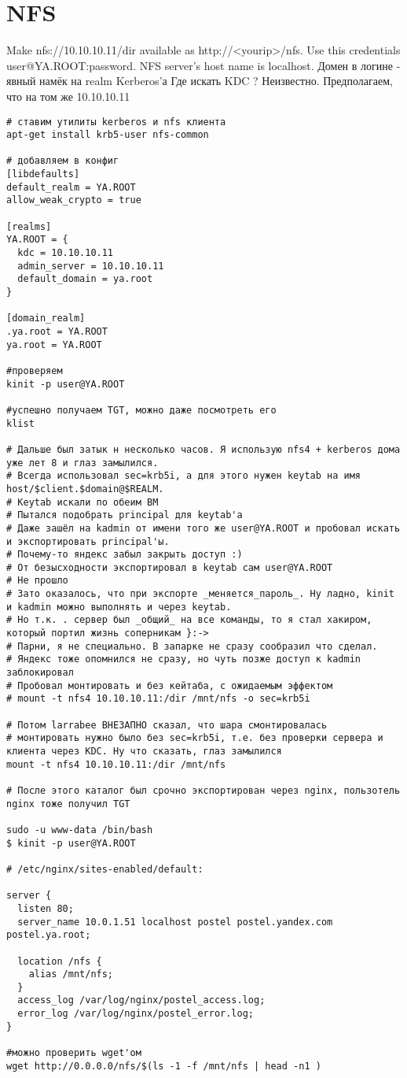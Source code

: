 \documentclass[a4paper,10pt]{report}
\begin{document}
\chapter{NFS}
Make nfs://10.10.10.11/dir available as http://<yourip>/nfs. Use this credentials user@YA.ROOT:password. NFS server's host name is localhost.
\newline\newline
Домен в логине - явный намёк на realm Kerberos'а
\newline
Где искать KDC ? Неизвестно. Предполагаем, что на том же 10.10.10.11
\newline
\begin{verbatim}
# ставим утилиты kerberos и nfs клиента
apt-get install krb5-user nfs-common

# добавляем в конфиг
[libdefaults]
default_realm = YA.ROOT
allow_weak_crypto = true

[realms]
YA.ROOT = {
  kdc = 10.10.10.11
  admin_server = 10.10.10.11
  default_domain = ya.root
}

[domain_realm]
.ya.root = YA.ROOT
ya.root = YA.ROOT

#проверяем
kinit -p user@YA.ROOT

#успешно получаем TGT, можно даже посмотреть его
klist

# Дальше был затык н несколько часов. Я использую nfs4 + kerberos дома уже лет 8 и глаз замылился.
# Всегда использовал sec=krb5i, а для этого нужен keytab на имя host/$client.$domain@$REALM.
# Keytab искали по обеим ВМ
# Пытался подобрать principal для keytab'а
# Даже зашёл на kadmin от имени того же user@YA.ROOT и пробовал искать и экспортировать principal'ы.
# Почему-то яндекс забыл закрыть доступ :)
# От безысходности экспортировал в keytab сам user@YA.ROOT
# Не прошло
# Зато оказалось, что при экспорте _меняется_пароль_. Ну ладно, kinit и kadmin можно выполнять и через keytab.
# Но т.к. . сервер был _общий_ на все команды, то я стал хакиром, который портил жизнь соперникам }:->
# Парни, я не специально. В запарке не сразу сообразил что сделал.
# Яндекс тоже опомнился не сразу, но чуть позже доступ к kadmin заблокировал
# Пробовал монтировать и без кейтаба, с ожидаемым эффектом
# mount -t nfs4 10.10.10.11:/dir /mnt/nfs -o sec=krb5i

# Потом larrabee ВНЕЗАПНО сказал, что шара смонтировалась
# монтировать нужно было без sec=krb5i, т.е. без проверки сервера и клиента через KDC. Ну что сказать, глаз замылился
mount -t nfs4 10.10.10.11:/dir /mnt/nfs

# После этого каталог был срочно экспортирован через nginx, пользотель nginx тоже получил TGT

sudo -u www-data /bin/bash
$ kinit -p user@YA.ROOT

# /etc/nginx/sites-enabled/default:

server {
  listen 80;
  server_name 10.0.1.51 localhost postel postel.yandex.com postel.ya.root;

  location /nfs {
    alias /mnt/nfs;
  }
  access_log /var/log/nginx/postel_access.log;
  error_log /var/log/nginx/postel_error.log;
}

#можно проверить wget'ом
wget http://0.0.0.0/nfs/$(ls -1 -f /mnt/nfs | head -n1 )
\end{verbatim}
\end{document}
